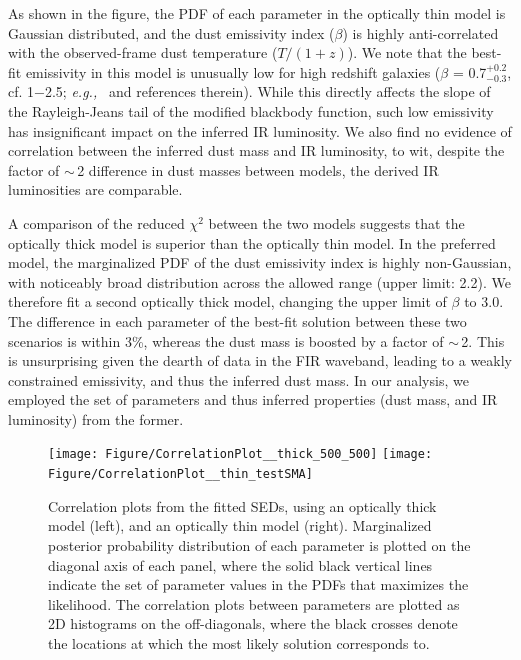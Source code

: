 \documentclass[twocolumn,apj,numberedappendix]{emulateapj}
\newcommand{\eg}{{\sl e.g.,~}}
\begin{document}
As shown in the figure, the PDF of each parameter in the optically thin model is Gaussian distributed, and 
the dust emissivity index ($\beta$) is highly anti-correlated with the observed-frame dust temperature ($T/(1+z)$).
We note that the best-fit emissivity in this model is unusually low for high redshift galaxies ($\beta$ = 0.7$^{+0.2}_{-0.3}$, cf. 1$-$2.5; \eg \citet{Casey12a} and references therein). While this directly affects the slope of the Rayleigh-Jeans tail of the modified blackbody function, such low emissivity has insignificant impact on the inferred IR luminosity.
We also find no evidence of correlation between the inferred dust mass and IR luminosity, to wit, despite the factor of $\sim$\,2 difference
in dust masses 
between models, the derived IR luminosities are comparable.

A comparison of the reduced $\chi^2$ between the two models suggests that the optically thick model is superior than the optically thin model. In the preferred model, the marginalized PDF of the dust emissivity index is highly non-Gaussian, with noticeably broad distribution across 
the allowed range (upper limit: 2.2). We therefore fit a second optically thick model, changing the upper limit of $\beta$ to 3.0. The difference in each 
parameter of the best-fit solution between these two scenarios is within 3\%, whereas the dust mass is boosted by a factor of $\sim$\,2. This is 
unsurprising given the dearth of data in the FIR waveband, leading to a weakly constrained emissivity, and thus the inferred dust mass. 
In our analysis, we employed the set of parameters and thus inferred properties (dust mass, and IR luminosity) from the former.


\begin{figure}[!tbph]
\centering
\texttt{[image: Figure/CorrelationPlot\_\_thick\_500\_500]}
\texttt{[image: Figure/CorrelationPlot\_\_thin\_testSMA]}
\caption{Correlation plots from the fitted SEDs, using an optically thick
model (left), and an optically thin model (right). Marginalized posterior probability 
distribution of each
parameter is plotted on the diagonal axis of each panel, where the solid black vertical lines indicate the set of parameter values in the PDFs that maximizes the likelihood. The correlation plots between parameters are plotted as 2D histograms on the off-diagonals, where the black crosses denote the 
locations 
at which the most likely solution corresponds to.
\label{fig:sedlikelihood}}
\end{figure}
\end{document}
